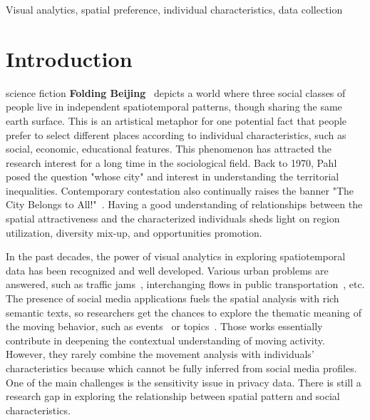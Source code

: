\documentclass{ieeeaccess}
\begin{document}
\begin{keywords}
Visual analytics, spatial preference, individual characteristics, data collection
\end{keywords}

\titlepgskip=-15pt

\maketitle

\section{Introduction}
\label{sec:introduction}
 science fiction \textbf{Folding Beijing}~\cite{hao2016_foldingbeijing} depicts a world where three social classes of people live in independent spatiotemporal patterns, though sharing the same earth surface. This is an artistical metaphor for one potential fact that people prefer to select different places according to individual characteristics, such as social, economic, educational features. This phenomenon has attracted the research interest for a long time in the sociological field. Back to 1970, Pahl~\cite{pahl1975whose} posed the question "whose city" and interest in understanding the territorial inequalities. Contemporary contestation also continually raises the banner "The City Belongs to All!"~\cite{Mayer2017_whosecity}. Having a good understanding of relationships between the spatial attractiveness and the characterized individuals sheds light on region utilization, diversity mix-up, and opportunities promotion.

In the past decades, the power of visual analytics in exploring spatiotemporal data has been recognized and well developed. Various urban problems are answered, such as traffic jams~\cite{wang2013visual}, interchanging flows in public transportation~\cite{zeng2013visualizing}, etc. The presence of social media applications fuels the spatial analysis with rich semantic texts, so researchers get the chances to explore the thematic meaning of the moving behavior, such as events~\cite{chen2017map} or topics~\cite{bosch2013scatterblogs2}. Those works essentially contribute in deepening the contextual understanding of moving activity. However, they rarely combine the movement analysis with individuals' characteristics because which cannot be fully inferred from social media profiles. One of the main challenges is the sensitivity issue in privacy data. There is still a research gap in exploring the relationship between spatial pattern and social characteristics.
\end{document}
